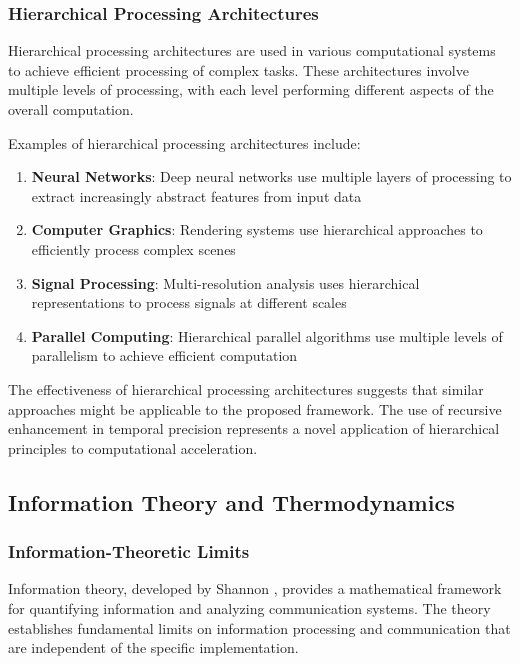 \documentclass[12pt,a4paper]{article}
\theoremstyle{definition}
\begin{document}
{\subsubsection{Hierarchical Processing Architectures}

Hierarchical processing architectures are used in various computational systems to achieve efficient processing of complex tasks. These architectures involve multiple levels of processing, with each level performing different aspects of the overall computation.

Examples of hierarchical processing architectures include:

\begin{enumerate}
\item \textbf{Neural Networks}: Deep neural networks use multiple layers of processing to extract increasingly abstract features from input data
\item \textbf{Computer Graphics}: Rendering systems use hierarchical approaches to efficiently process complex scenes
\item \textbf{Signal Processing}: Multi-resolution analysis uses hierarchical representations to process signals at different scales
\item \textbf{Parallel Computing}: Hierarchical parallel algorithms use multiple levels of parallelism to achieve efficient computation
\end{enumerate}

The effectiveness of hierarchical processing architectures suggests that similar approaches might be applicable to the proposed framework. The use of recursive enhancement in temporal precision represents a novel application of hierarchical principles to computational acceleration.

\subsection{Information Theory and Thermodynamics}

\subsubsection{Information-Theoretic Limits}

Information theory, developed by Shannon \cite{shannon1948mathematical}, provides a mathematical framework for quantifying information and analyzing communication systems. The theory establishes fundamental limits on information processing and communication that are independent of the specific implementation.

}
\end{document}
